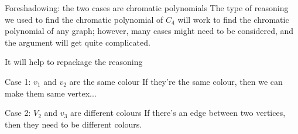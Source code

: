 \documentclass{beamer}
\begin{document}
\begin{frame}{Foreshadowing: the two cases are chromatic polynomials}
  The type of reasoning we used to find the chromatic polynomial of $C_4$ will work to find the chromatic polynomial of any graph; however, many cases might need to be considered, and the argument will get quite complicated.

  \begin{block}{It will help to repackage the reasoning}
    \end{block}

  \begin{block}{Case 1: $v_1$ and $v_2$ are the same colour}
If they're the same colour, then we can make them same vertex...
        \end{block}
  
  \begin{block}{Case 2: $V_2$ and $v_3$ are different colours}
        If there's an edge between two vertices, then they need to be different colours.
  \end{block}

\end{frame}
\end{document}
